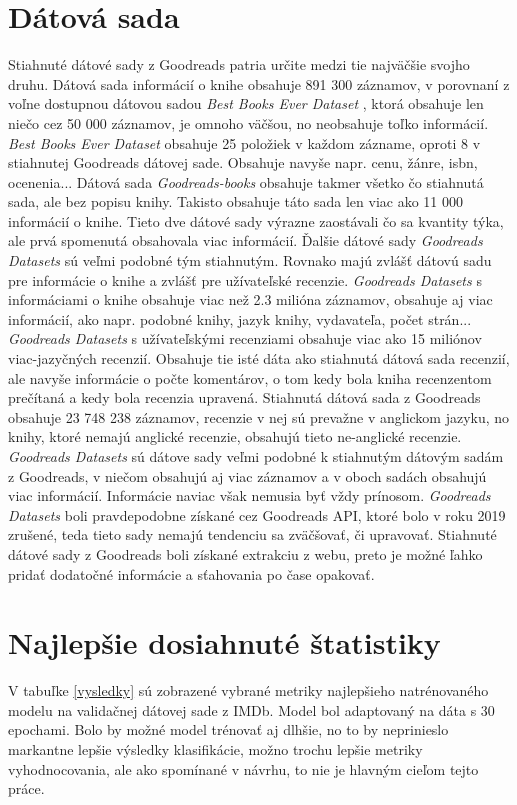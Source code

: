 \section{Dátová sada}
Stiahnuté dátové sady z Goodreads patria určite medzi tie najväčšie svojho druhu. Dátová sada informácií o knihe obsahuje 891 300 záznamov, v porovnaní z voľne dostupnou dátovou sadou \textit{Best Books Ever Dataset} \cite{Lozano:2020}, ktorá obsahuje len niečo cez 50 000 záznamov, je omnoho väčšou, no neobsahuje toľko informácií. \textit{Best Books Ever Dataset} obsahuje 25 položiek v každom zázname, oproti 8 v stiahnutej Goodreads dátovej sade. Obsahuje navyše napr. cenu, žánre, isbn, ocenenia... Dátová sada 
\textit{Goodreads-books} \cite{Dasgupta:2020} obsahuje takmer všetko čo stiahnutá sada, ale bez popisu knihy. Takisto obsahuje táto sada len viac ako 11 000 informácií o knihe. Tieto dve dátové sady výrazne zaostávali čo sa kvantity týka, ale prvá spomenutá obsahovala viac informácií. Ďalšie dátové sady \textit{Goodreads Datasets} \cite{Wan:2019} \cite{Wan:2018} sú veľmi podobné tým stiahnutým. Rovnako majú zvlášť dátovú sadu pre informácie o knihe a zvlášť pre užívateľské recenzie. \textit{Goodreads Datasets} s informáciami o knihe obsahuje viac než 2.3 milióna záznamov, obsahuje aj viac informácií, ako napr. podobné knihy, jazyk knihy, vydavateľa, počet strán... \textit{Goodreads Datasets} s užívateľskými recenziami obsahuje viac ako 15 miliónov viac-jazyčných recenzií. Obsahuje tie isté dáta ako stiahnutá dátová sada recenzií, ale navyše informácie o počte komentárov, o tom kedy bola kniha recenzentom prečítaná a kedy bola recenzia upravená. Stiahnutá dátová sada z Goodreads obsahuje 23 748 238 záznamov, recenzie v nej sú prevažne v anglickom jazyku, no knihy, ktoré nemajú anglické recenzie, obsahujú tieto ne-anglické recenzie. \textit{Goodreads Datasets} sú dátove sady veľmi podobné k stiahnutým dátovým sadám z Goodreads, v niečom obsahujú aj viac záznamov a v oboch sadách obsahujú viac informácií. Informácie naviac však nemusia byť vždy prínosom. \textit{Goodreads Datasets} boli pravdepodobne získané cez Goodreads API, ktoré bolo v roku 2019 zrušené, teda tieto sady nemajú tendenciu sa zväčšovať, či upravovať. Stiahnuté dátové sady z Goodreads boli získané extrakciu z webu, preto je možné ľahko pridať dodatočné informácie a sťahovania po čase opakovať.

\section{Najlepšie dosiahnuté štatistiky}
V tabuľke \ref{vysledky} sú zobrazené vybrané metriky najlepšieho natrénovaného modelu na validačnej dátovej sade z IMDb. Model bol adaptovaný na dáta s 30  epochami. Bolo by možné model trénovať aj dlhšie, no to by neprinieslo markantne lepšie výsledky klasifikácie, možno trochu lepšie metriky vyhodnocovania, ale ako spomínané v návrhu, to nie je hlavným cieľom tejto práce. 

